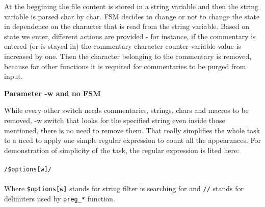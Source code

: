 \documentclass[10pt, a4paper]{report}
\begin{document}
	\vspace{0.15cm}
	\par\fontsize{10pt}{1.3}\selectfont
	{
		At the beggining the file content is stored in a string variable and then the string variable is parsed char by char. FSM decides to change or not to change the state in dependence on the character that is read from the string variable. Based on state we enter, different actions are provided - for instance, if the commentary is entered (or is stayed in) the commentary character counter variable value is increased by one. Then the character belonging to the commentary is removed, because for other functions it is required for commentaries to be purged from input.
	}

	\vspace{0.35cm}
	\par\noindent\fontsize{11pt}{1.3}\selectfont\textbf{Parameter -w and no FSM}
	\vspace{0.15cm}
	\par\fontsize{10pt}{1.3}\selectfont
	{
		While every other switch needs commentaries, strings, chars and macros to be removed, -w switch that looks for the specified string even inside those mentioned, there is no need to remove them. That really simplifies the whole task to a need to apply one simple regular expression to count all the appearances. For demonstration of simplicity of the task, the regular expression is lited here: \\ \\
		\verb|/$options[w]/| \\ \\

		Where \verb|$options[w]| stands for string filter is searching for and \verb|//| stands for delimiters used by \verb|preg_*| function.
	}
\end{document}
